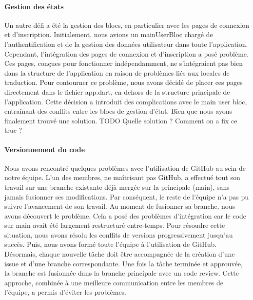 \paragraph{Gestion des états} Un autre défi a été la gestion des blocs, en particulier avec les pages de connexion et d'inscription. Initialement, nous avions un mainUserBloc chargé de l'authentification et de la gestion des données utilisateur dans toute l'application. Cependant, l'intégration des pages de connexion et d'inscription a posé problème. Ces pages, conçues pour fonctionner indépendamment, ne s'intégraient pas bien dans la structure de l'application en raison de problèmes liés aux locales de traduction. Pour contourner ce problème, nous avons décidé de placer ces pages directement dans le fichier app.dart, en dehors de la structure principale de l'application. Cette décision a introduit des complications avec le main user bloc, entraînant des conflits entre les blocs de gestion d'état. Bien que nous ayons finalement trouvé une solution. TODO Quelle solution ? Comment on a fix ce truc ?

\paragraph{Versionnement du code} Nous avons rencontré quelques problèmes avec l'utilisation de GitHub au sein de notre équipe. L'un des membres, ne maîtrisant pas GitHub, a effectué tout son travail sur une branche existante déjà mergée sur la principale (main), sans jamais fusionner ses modifications. Par conséquent, le reste de l'équipe n'a pas pu suivre l'avancement de son travail. Au moment de fusionner sa branche, nous avons découvert le problème. Cela a posé des problèmes d'intégration car le code sur main avait été largement restructuré entre-temps. Pour résoudre cette situation, nous avons résolu les conflits de versions progressivement jusqu'au succès. Puis, nous avons formé toute l'équipe à l'utilisation de GitHub. Désormais, chaque nouvelle tâche doit être accompagnée de la création d'une issue et d'une branche correspondante. Une fois la tâche terminée et approuvée, la branche est fusionnée dans la branche principale avec un code review. Cette approche, combinée à une meilleure communication entre les membres de l'équipe, a permis d'éviter les problèmes.

